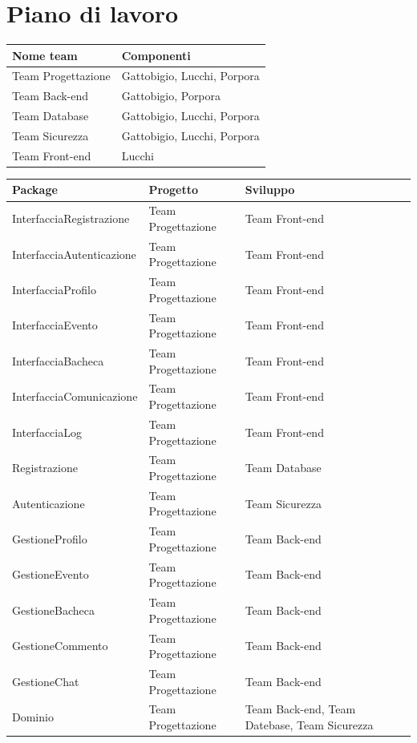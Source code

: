 \documentclass[12pt,a4paper]{report}
\begin{document}
\section{Piano di lavoro}
\begin{tabularx}{\textwidth}{|X|X|}
    \hline
    \rowcolor{studyColor} \textbf{Nome team} & \textbf{Componenti} \\ \hline
    \endhead
    Team Progettazione & Gattobigio, Lucchi, Porpora \\ \hline
    Team Back-end & Gattobigio, Porpora \\ \hline
    Team Database & Gattobigio, Lucchi, Porpora \\ \hline
    Team Sicurezza & Gattobigio, Lucchi, Porpora \\ \hline
    Team Front-end & Lucchi \\ \hline
\end{tabularx}
\vspace{0.5cm}
\begin{tabularx}{\textwidth}{|X|X|X|}
    \hline
    \rowcolor{studyColor} \textbf{Package} & \textbf{Progetto} & \textbf{Sviluppo} \\ \hline
    \endhead
    InterfacciaRegistrazione & Team Progettazione & Team Front-end \\ \hline
    InterfacciaAutenticazione & Team Progettazione & Team Front-end \\ \hline
    InterfacciaProfilo & Team Progettazione & Team Front-end \\ \hline
    InterfacciaEvento & Team Progettazione & Team Front-end \\ \hline
    InterfacciaBacheca & Team Progettazione & Team Front-end \\ \hline
    InterfacciaComunicazione & Team Progettazione & Team Front-end \\ \hline
    InterfacciaLog & Team Progettazione & Team Front-end \\ \hline
    Registrazione & Team Progettazione & Team Database \\ \hline
    Autenticazione & Team Progettazione & Team Sicurezza \\ \hline
    GestioneProfilo & Team Progettazione & Team Back-end \\ \hline
    GestioneEvento & Team Progettazione & Team Back-end \\ \hline
    GestioneBacheca & Team Progettazione & Team Back-end \\ \hline
    GestioneCommento & Team Progettazione & Team Back-end \\ \hline
    GestioneChat & Team Progettazione & Team Back-end \\ \hline
    Dominio & Team Progettazione & Team Back-end, Team Datebase, Team Sicurezza \\ \hline

\end{tabularx}
\end{document}
